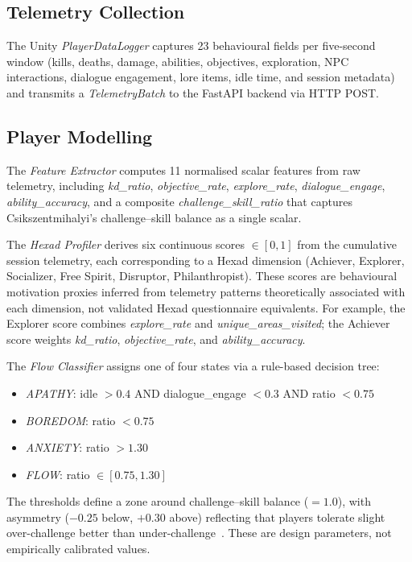 \documentclass[conference]{IEEEtran}
\begin{document}
\subsection{Telemetry Collection}

The Unity \textit{PlayerDataLogger} captures 23 behavioural fields per five-second window (kills, deaths, damage, abilities, objectives, exploration, NPC interactions, dialogue engagement, lore items, idle time, and session metadata) and transmits a \textit{TelemetryBatch} to the FastAPI backend via HTTP POST.

\subsection{Player Modelling}

The \textit{Feature Extractor} computes 11 normalised scalar features from raw telemetry, including \textit{kd\_ratio}, \textit{objective\_rate}, \textit{explore\_rate}, \textit{dialogue\_engage}, \textit{ability\_accuracy}, and a composite \textit{challenge\_skill\_ratio} that captures Csikszentmihalyi's challenge--skill balance as a single scalar.

The \textit{Hexad Profiler} derives six continuous scores $\in [0,1]$ from the cumulative session telemetry, each corresponding to a Hexad dimension (Achiever, Explorer, Socializer, Free Spirit, Disruptor, Philanthropist). These scores are behavioural motivation proxies inferred from telemetry patterns theoretically associated with each dimension, not validated Hexad questionnaire equivalents. For example, the Explorer score combines \textit{explore\_rate} and \textit{unique\_areas\_visited}; the Achiever score weights \textit{kd\_ratio}, \textit{objective\_rate}, and \textit{ability\_accuracy}.

The \textit{Flow Classifier} assigns one of four states via a rule-based decision tree:
\begin{itemize}
    \item \textit{APATHY}: idle $> 0.4$ AND dialogue\_engage $< 0.3$ AND ratio $< 0.75$
    \item \textit{BOREDOM}: ratio $< 0.75$
    \item \textit{ANXIETY}: ratio $> 1.30$
    \item \textit{FLOW}: ratio $\in [0.75, 1.30]$
\end{itemize}
The thresholds define a zone around challenge--skill balance ($= 1.0$), with asymmetry ($-0.25$ below, $+0.30$ above) reflecting that players tolerate slight over-challenge better than under-challenge~\cite{yannakakis2009realtime}. These are design parameters, not empirically calibrated values.
\end{document}
